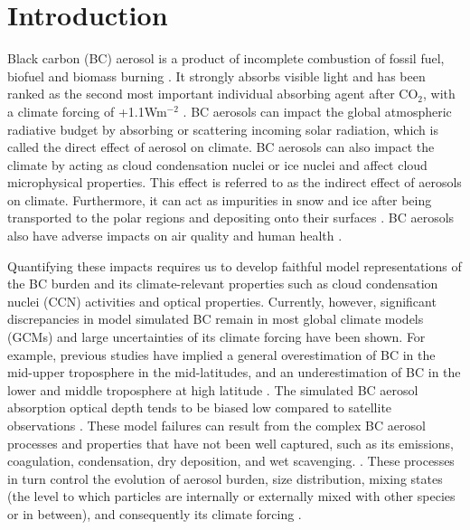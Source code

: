 \documentclass[12pt, fullpage]{uiucthesis2009_2}
\begin{document}
\chapter{Introduction}
	Black carbon (BC) aerosol is a product of incomplete combustion of fossil fuel, biofuel and biomass burning \citep[e.g.][]{Bond2004,forsstrom2013}. It strongly absorbs visible light and has been ranked as the second most important individual absorbing agent after CO$_{2}$, with a climate forcing of +1.1Wm$^{-2}$ \citep{Bond2013}. BC aerosols can impact the global atmospheric radiative budget by absorbing or scattering incoming solar radiation, which is called the direct effect of aerosol on climate. BC aerosols can also impact the climate by acting as cloud condensation nuclei or ice nuclei and affect cloud microphysical properties. This effect is referred to as the indirect effect of aerosols on climate. Furthermore, it can act as impurities in snow and ice after being transported to the polar regions and depositing onto their surfaces \citep[e.g.][]{zuberi2005hydrophilic,flanner2007present}. BC aerosols also have adverse impacts on air quality and human health \citep{highwood2006smoke}.
	
	Quantifying these impacts requires us to develop faithful model representations of the BC burden and its climate-relevant properties such as cloud condensation nuclei (CCN) activities and optical properties. Currently, however, significant discrepancies in model simulated BC remain in most global climate models (GCMs) and large uncertainties of its climate forcing have been shown. For example, previous studies have implied a general overestimation of BC in the mid-upper troposphere in the mid-latitudes, and an underestimation of BC in the lower and middle troposphere at high latitude \citep[e.g.][]{koch2009evaluation,schwarz2010global,fan2012easy}. The simulated BC aerosol absorption optical depth tends to be biased low compared to satellite observations \citep[e.g.][]{koch2009evaluation}. These model failures can result from the complex BC aerosol processes and properties that have not been well captured, such as its emissions, coagulation, condensation, dry deposition, and wet scavenging. \citep[][]{hakami2005adjoint,koch2009evaluation,shindell2012simultaneously}. These processes in turn control the evolution of aerosol burden, size distribution, mixing states (the level to which particles are internally or externally mixed with other species or in between), and consequently its climate forcing \citep[e.g.][]{schulz2006radiative}. 
	
\end{document}
